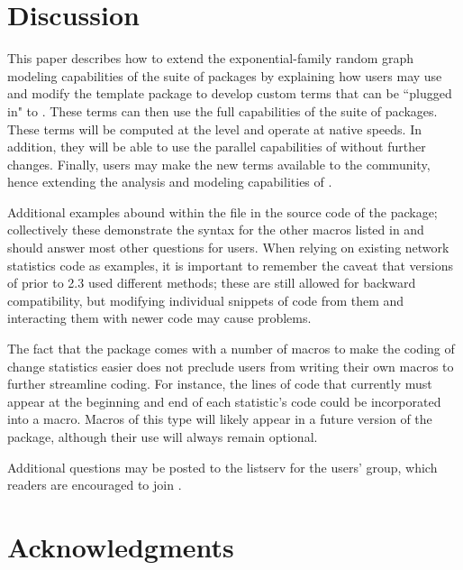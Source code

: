 \documentclass[nojss]{jss}
\begin{document}
\section{Discussion}

This paper describes how to extend the exponential-family random graph modeling
capabilities of the  suite of packages by
explaining how users may use and modify the template package  to develop custom terms that can be ``plugged in" to . These terms can then use the full capabilities of the  suite of packages.
These terms will be computed at the  level and operate at native speeds. In
addition, they will be able to use the parallel capabilities of 
without further changes. 
Finally, users may make the new terms
available to the  community, hence extending the analysis and
modeling capabilities of .

Additional examples abound within the  file in the source
code of the  package; 
collectively these demonstrate the syntax for the other macros listed in
 and should answer most other questions for users. When
relying on existing network statistics code as examples, it is important to
remember the caveat that versions of  prior to 2.3 used different
methods; these are still allowed for backward compatibility, but modifying
individual snippets of code from them and interacting them with newer code may
cause problems.

The fact that the  package comes with a number of macros to
make the coding of change statistics easier does not preclude users from
writing their own macros to further streamline coding. For
instance, the lines of code that currently must appear at the beginning and end
of each statistic's  code could be incorporated into a macro. Macros
of this type will likely appear in a future version
of the  package, although their use will always remain
optional.

Additional questions may be posted to the listserv for the  users'
group, which readers are encouraged to join \citep{statnetusersgroup}.

\section*{Acknowledgments}
\end{document}
